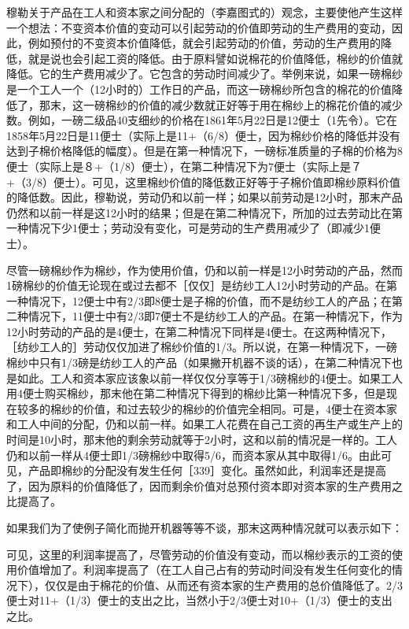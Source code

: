 穆勒关于产品在工人和资本家之间分配的（李嘉图式的）观念，主要使他产生这样一个想法：不变资本价值的变动可以引起劳动的价值即劳动的生产费用的变动，因此，例如预付的不变资本价值降低，就会引起劳动的价值，劳动的生产费用的降低，就是说也会引起工资的降低。由于原料譬如说棉花的价值降低，棉纱的价值就降低。它的生产费用减少了。它包含的劳动时间减少了。举例来说，如果一磅棉纱是一个工人一个（12小时的）工作日的产品，而这一磅棉纱所包含的棉花的价值降低了，那末，这一磅棉纱的价值的减少数就正好等于用在棉纱上的棉花价值的减少数。例如，一磅二级品40支细纱的价格在1861年5月22日是12便士（1先令）。它在1858年5月22日是11便士（实际上是11+（6/8）便士，因为棉纱价格的降低并没有达到子棉价格降低的幅度）。但是在第一种情况下，一磅标准质量的子棉的价格为8便士（实际上是８+（1/8）便士），在第二种情况下为7便士（实际上是７+（3/8）便士）。可见，这里棉纱价值的降低数正好等于子棉价值即棉纱原料价值的降低数。因此，穆勒说，劳动仍和以前一样；如果以前劳动是12小时，那末产品仍然和以前一样是这12小时的结果；但是在第二种情况下，所加的过去劳动比在第一种情况下少1便士；劳动没有变化，可是劳动的生产费用减少了（即减少1便士）。

尽管一磅棉纱作为棉纱，作为使用价值，仍和以前一样是12小时劳动的产品，然而1磅棉纱的价值无论现在或过去都不［仅仅］是纺纱工人12小时劳动的产品。在第一种情况下，12便士中有2/3即8便士是子棉的价值，而不是纺纱工人的产品；在第二种情况下，11便士中有2/3即7便士不是纺纱工人的产品。在第一种情况下，作为12小时劳动的产品的是4便士，在第二种情况下同样是4便士。在这两种情况下，［纺纱工人的］劳动仅仅加进了棉纱价值的1/3。所以说，在第一种情况下，一磅棉纱中只有1/3磅是纺纱工人的产品（如果撇开机器不谈的话），在第二种情况下也是如此。工人和资本家应该象以前一样仅仅分享等于1/3磅棉纱的4便士。如果工人用4便士购买棉纱，那末他在第二种情况下得到的棉纱比第一种情况下多，但是现在较多的棉纱的价值，和过去较少的棉纱的价值完全相同。可是，4便士在资本家和工人中间的分配，仍和以前一样。如果工人花费在自己工资的再生产或生产上的时间是10小时，那末他的剩余劳动就等于2小时，这和以前的情况是一样的。工人仍和以前一样从4便士即1/3磅棉纱中取得5/6，而资本家从其中取得1/6。由此可见，产品即棉纱的分配没有发生任何［339］变化。虽然如此，利润率还是提高了，因为原料的价值降低了，因而剩余价值对总预付资本即对资本家的生产费用之比提高了。

如果我们为了使例子简化而抛开机器等等不谈，那末这两种情况就可以表示如下：

可见，这里的利润率提高了，尽管劳动的价值没有变动，而以棉纱表示的工资的使用价值增加了。利润率提高了（在工人自己占有的劳动时间没有发生任何变化的情况下），仅仅是由于棉花的价值、从而还有资本家的生产费用的总价值降低了。2/3便士对11+（1/3）便士的支出之比，当然小于2/3便士对10+（1/3）便士的支出之比。

